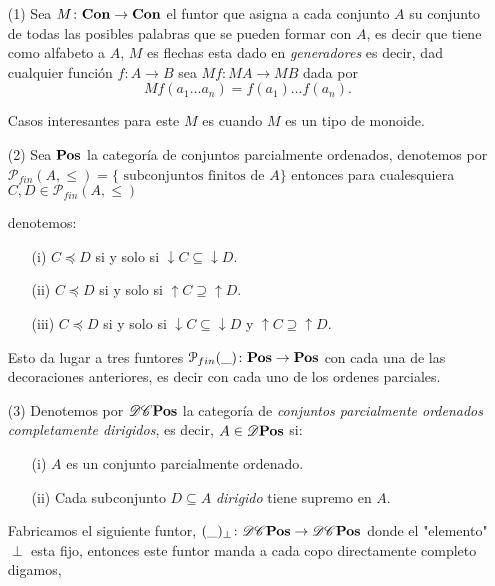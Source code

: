 \documentclass{comunicaciones}
\begin{document}
\begin{itemize}
\item[(1)]
Sea $M\colon \mathbf{Con}\rightarrow\mathbf{Con}$ el funtor que asigna a cada conjunto $A$ su conjunto de todas las posibles palabras que se pueden formar con $A$, es decir que tiene como alfabeto
a $A$, $M$ es flechas esta dado en \emph{generadores} es decir, dad cualquier función $f\colon A\rightarrow B$ sea $Mf\colon MA\rightarrow MB$ dada por \[Mf(a_{1}\ldots a_{n})=f(a_{1})\ldots f(a_{n}).\]

Casos interesantes para este $M$ es cuando $M$ es un tipo de monoide.


\item[(2)]
Sea $\mathbf{Pos}$ la categoría de conjuntos parcialmente ordenados, denotemos por 
$\mathcal{P}_{fin}(A,\leq)=\{\text{ subconjuntos finitos de } A\}$ entonces para cualesquiera $C,D\in\mathcal{P}_{fin}(A,\leq)$

denotemos:

\begin{enumerate}
\item[(i)] $C\preceq D$ si y solo si $\downarrow C\subseteq\downarrow D$.
\item[(ii)] $C\preceq D$ si y solo si $\uparrow C\supseteq\uparrow D$.
\item[(iii)]  $C\preceq D$ si y solo si $\downarrow C\subseteq\downarrow D$ y $\uparrow C\supseteq\uparrow D$.
\end{enumerate}
Esto da lugar a tres funtores $\mathcal{P}_{fin}(\_)\colon\mathbf{Pos}\rightarrow\mathbf{Pos}$ con cada una de las decoraciones anteriores, es decir con cada uno de los ordenes parciales.

\item[(3)]
Denotemos por $\mathscr D\mathscr C\mathbf{Pos}$ la categoría de \emph{conjuntos parcialmente ordenados completamente dirigidos}, es decir, $A\in  \mathscr D\mathbf{Pos}$ si:

\begin{enumerate}
    \item[(i)] $A$ es un conjunto parcialmente ordenado.
    \item[(ii)] Cada subconjunto $D\subseteq A$ \emph{dirigido} tiene supremo en $A$. 
\end{enumerate}
Fabricamos el siguiente funtor, $(\_)_{\perp}\colon\mathscr D\mathscr C\mathbf{Pos}\rightarrow \mathscr D\mathscr C\mathbf{Pos} $ donde el "elemento" $\perp$ esta fijo, entonces este funtor manda a cada copo directamente completo digamos,


\end{itemize}
\end{document}
